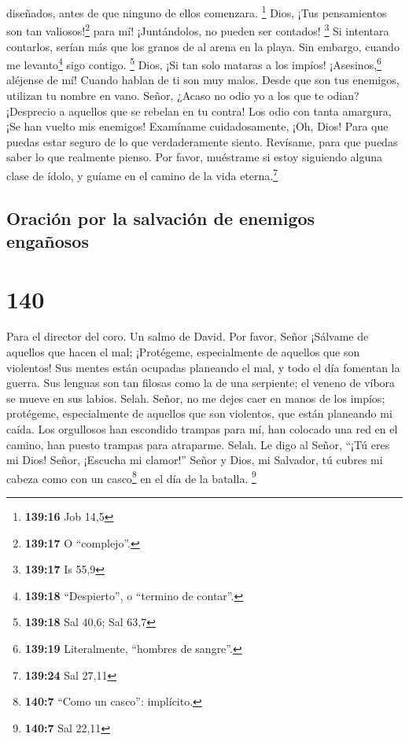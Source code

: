 diseñados, antes de que ninguno de ellos comenzara. \footnote{\textbf{139:16}
  Job 14,5}  Dios, ¡Tus pensamientos son tan
valiosos!\footnote{\textbf{139:17} O ``complejo''.} para mí!
¡Juntándolos, no pueden ser contados! \footnote{\textbf{139:17} Is 55,9}
 Si intentara contarlos, serían más que los granos de al
arena en la playa. Sin embargo, cuando me levanto\footnote{\textbf{139:18}
  ``Despierto'', o ``termino de contar''.} sigo contigo. \footnote{\textbf{139:18}
  Sal 40,6; Sal 63,7}  Dios, ¡Si tan solo mataras a los
impíos! ¡Asesinos,\footnote{\textbf{139:19} Literalmente, ``hombres de
  sangre''.} aléjense de mí!  Cuando hablan de ti son muy
malos. Desde que son tus enemigos, utilizan tu nombre en vano.
 Señor, ¿Acaso no odio yo a los que te odian? ¡Desprecio
a aquellos que se rebelan en tu contra!  Los odio con
tanta amargura, ¡Se han vuelto mis enemigos!  Examíname
cuidadosamente, ¡Oh, Dios! Para que puedas estar seguro de lo que
verdaderamente siento. Revísame, para que puedas saber lo que realmente
pienso.  Por favor, muéstrame si estoy siguiendo alguna
clase de ídolo, y guíame en el camino de la vida eterna.\footnote{\textbf{139:24}
  Sal 27,11}

\hypertarget{oraciuxf3n-por-la-salvaciuxf3n-de-enemigos-engauxf1osos}{%
\subsection{Oración por la salvación de enemigos
engañosos}\label{oraciuxf3n-por-la-salvaciuxf3n-de-enemigos-engauxf1osos}}

\hypertarget{section-139}{%
\section{140}\label{section-139}}

Para el director del coro. Un salmo de David.  Por favor,
Señor ¡Sálvame de aquellos que hacen el mal; ¡Protégeme, especialmente
de aquellos que son violentos!  Sus mentes están ocupadas
planeando el mal, y todo el día fomentan la guerra.  Sus
lenguas son tan filosas como la de una serpiente; el veneno de víbora se
mueve en sus labios. Selah.  Señor, no me dejes caer en
manos de los impíos; protégeme, especialmente de aquellos que son
violentos, que están planeando mi caída.  Los orgullosos
han escondido trampas para mí, han colocado una red en el camino, han
puesto trampas para atraparme. Selah.  Le digo al Señor,
``¡Tú eres mi Dios! Señor, ¡Escucha mi clamor!''  Señor y
Dios, mi Salvador, tú cubres mi cabeza como con un casco\footnote{\textbf{140:7}
  ``Como un casco'': implícito.} en el día de la batalla. \footnote{\textbf{140:7}
  Sal 22,11}

